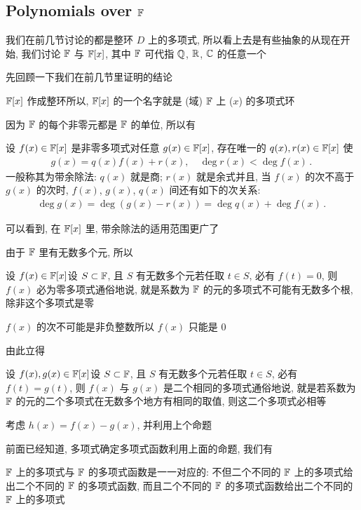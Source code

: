 \subsection*{Polynomials over $\mathbb{F}$}

我们在前几节讨论的都是整环 $D$ 上的多项式, 所以看上去是有些抽象的\period 从现在开始, 我们讨论 $\mathbb{F}$ 与 $\mathbb{F}[x]$, 其中 $\mathbb{F}$ 可代指 $\mathbb{Q}$, $\mathbb{R}$, $\mathbb{C}$ 的任意一个\period

先回顾一下我们在前几节里证明的结论\period

\begin{proposition}
    $\mathbb{F}[x]$ 作成整环\period 所以, $\mathbb{F}[x]$ 的一个名字就是 (域) $\mathbb{F}$ 上 ($x$) 的多项式环\period
\end{proposition}

因为 $\mathbb{F}$ 的每个非零元都是 $\mathbb{F}$ 的单位, 所以有

\begin{proposition}
    设 $f(x) \in \mathbb{F}[x]$ 是非零多项式\period 对任意 $g(x) \in \mathbb{F}[x]$, 存在唯一的 $q(x), r(x) \in \mathbb{F}[x]$ 使
    \begin{align*}
        g(x) = q(x) f(x) + r(x), \quad \deg r(x) < \deg f(x) \period
    \end{align*}
    一般称其为带余除法: $q(x)$ 就是商; $r(x)$ 就是余式\period 并且, 当 $f(x)$ 的次不高于 $g(x)$ 的次时, $f(x)$, $g(x)$, $q(x)$ 间还有如下的次关系:
    \begin{align*}
        \deg g(x) = \deg (g(x) - r(x)) = \deg q(x) + \deg f(x) \period
    \end{align*}
\end{proposition}

可以看到, 在 $\mathbb{F}[x]$ 里, 带余除法的适用范围更广了\period

由于 $\mathbb{F}$ 里有无数多个元, 所以

\begin{proposition}
    设 $f(x) \in \mathbb{F}[x]$\period 设 $S \subset \mathbb{F}$, 且 $S$ 有无数多个元\period 若任取 $t \in S$, 必有 $f(t) = 0$, 则 $f(x)$ 必为零多项式\period 通俗地说, 就是系数为 $\mathbb{F}$ 的元的多项式不可能有无数多个根, 除非这个多项式是零\period
\end{proposition}

\begin{pf}
    $f(x)$ 的次不可能是非负整数\period 所以 $f(x)$ 只能是 $0$\period
\end{pf}

由此立得

\begin{proposition}
    设 $f(x),g(x) \in \mathbb{F}[x]$\period 设 $S \subset \mathbb{F}$, 且 $S$ 有无数多个元\period 若任取 $t \in S$, 必有 $f(t) = g(t)$, 则 $f(x)$ 与 $g(x)$ 是二个相同的多项式\period 通俗地说, 就是若系数为 $\mathbb{F}$ 的元的二个多项式在无数多个地方有相同的取值, 则这二个多项式必相等\period
\end{proposition}

\begin{pf}
    考虑 $h(x) = f(x) - g(x)$, 并利用上个命题\period
\end{pf}

前面已经知道, 多项式确定多项式函数\period 利用上面的命题, 我们有

\begin{proposition}
    $\mathbb{F}$ 上的多项式与 $\mathbb{F}$ 的多项式函数是一一对应的: 不但二个不同的 $\mathbb{F}$ 上的多项式给出二个不同的 $\mathbb{F}$ 的多项式函数, 而且二个不同的 $\mathbb{F}$ 的多项式函数给出二个不同的 $\mathbb{F}$ 上的多项式\period
\end{proposition}
